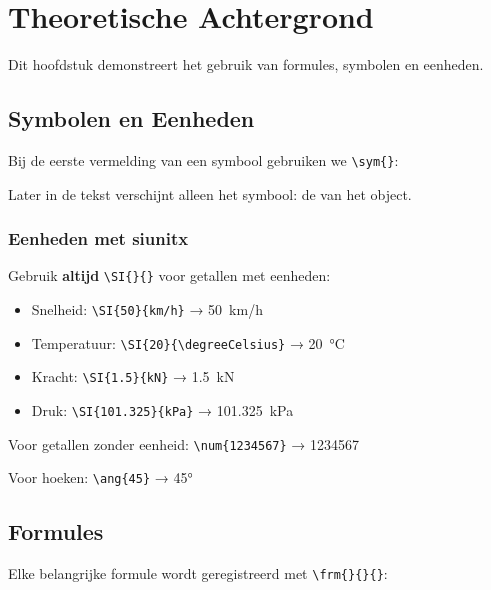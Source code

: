 
\chapter{Theoretische Achtergrond}
\label{ch:theorie}

Dit hoofdstuk demonstreert het gebruik van formules, symbolen en eenheden.

\section{Symbolen en Eenheden}

Bij de eerste vermelding van een symbool gebruiken we \verb|\sym{}|:


Later in de tekst verschijnt alleen het symbool: de  van het object.

\subsection{Eenheden met siunitx}

\begin{theorieblok}
Gebruik \textbf{altijd} \verb|\SI{}{}| voor getallen met eenheden:
\begin{itemize}
    \item Snelheid: \verb|\SI{50}{km/h}| → \SI{50}{km/h}
    \item Temperatuur: \verb|\SI{20}{\degreeCelsius}| → \SI{20}{\degreeCelsius}
    \item Kracht: \verb|\SI{1.5}{kN}| → \SI{1.5}{kN}
    \item Druk: \verb|\SI{101.325}{kPa}| → \SI{101.325}{kPa}
\end{itemize}

Voor getallen zonder eenheid: \verb|\num{1234567}| → \num{1234567}

Voor hoeken: \verb|\ang{45}| → \ang{45}
\end{theorieblok}

\section{Formules}

Elke belangrijke formule wordt geregistreerd met \verb|\frm{}{}{}|:


